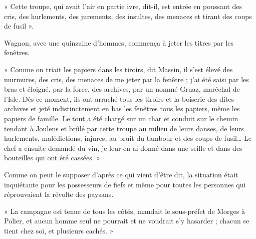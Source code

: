 \documentclass[french,twoside]{book} %
\newenvironment{quoteblock}%
  {\begin{quoting}}
  {\end{quoting}}
\newenvironment{quotebar}{%
    \def\FrameCommand{{\color{rubric!10!}\vrule width 0.5em} \hspace{0.9em}}%
    \def\OuterFrameSep{\itemsep} %
    \MakeFramed {\advance\hsize-\width \FrameRestore}
  }%
  {%
    \endMakeFramed
  }
\renewenvironment{quoteblock}%
  {%
    \savenotes
    \setstretch{0.9}
    \begin{quotebar}
  }
  {%
    \end{quotebar}
    \spewnotes
  }
\begin{document}
\begin{quoteblock}
 \noindent « Cette troupe, qui avait l’air en partie ivre, dit-il, est entrée en poussant des cris, des hurlements, des jurements, des insultes, des menaces et tirant des coups de fusil ».
 \end{quoteblock}

\noindent Wagnon, avec une quinzaine d’hommes, commença à jeter les titres par les fenêtres.\par

\begin{quoteblock}
 \noindent « Comme on triait les papiers dans les tiroirs, dit Massin, il s’est élevé des murmures, des cris, des menaces de me jeter par la fenêtre ; j’ai été saisi par les bras et éloigné, par la force, des archives, par un nommé Gruaz, maréchal de l’Isle. Dès ce moment, ils ont arraché tous les tiroirs et la boiserie des dites archives et jeté indistinctement en bas les fenêtres tous les papiers, même les papiers de famille. Le tout a été chargé sur un char et conduit sur le chemin tendant à Joulens et brûlé par cette troupe au milieu de leurs danses, de leurs hurlements, malédictions, injures, au bruit du tambour et des coups de fusil… Le chef a ensuite demandé du vin, je leur en ai donné dans une seille et dans des bouteilles qui ont été cassées. »
 \end{quoteblock}

\noindent Comme on peut le supposer d’après ce qui vient d’être dit, la situation était inquiétante pour les possesseurs de fiefs et même pour toutes les personnes qui réprouvaient la révolte des paysans.\par

\begin{quoteblock}
 \noindent « La campagne est tenue de tous les côtés, mandait le sous-préfet de Morges à Polier, et aucun homme seul ne pourrait et ne voudrait s’y hasarder ; chacun se tient chez soi, et plusieurs cachés. »
 \end{quoteblock}
\end{document}
